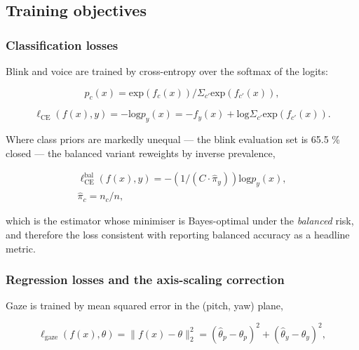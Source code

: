 \FloatBarrier

\subsection{Training objectives}

\subsubsection{Classification losses}

Blink and voice are trained by cross-entropy over the softmax of the logits:

\begin{equation}
\label{eq:87}
p_c(x) = \mathrm{exp}( f_c(x) ) / \Sigma _{c'} \mathrm{exp}( f_{c'}(x) ),
\end{equation}

\begin{equation}
\label{eq:88}
\ell _{\mathrm{CE}}( f(x), y ) = - \mathrm{log} p_y(x) = - f_y(x) + \mathrm{log} \Sigma _{c'} \mathrm{exp}( f_{c'}(x) ).
\end{equation}

Where class priors are markedly unequal --- the blink evaluation set is 65.5 \% closed --- the balanced variant reweights by inverse prevalence,

\begin{equation}
\label{eq:89}
\begin{aligned}
\ell _{\mathrm{CE}}^{\mathrm{bal}}( f(x), y ) = - ( 1 / ( C \cdot \hat{\pi }_y ) ) \mathrm{log} p_y(x), \\
\hat{\pi }_c = n_c / n ,
\end{aligned}
\end{equation}

which is the estimator whose minimiser is Bayes-optimal under the \emph{balanced} risk, and therefore the loss consistent with reporting balanced accuracy as a headline metric.

\subsubsection{Regression losses and the axis-scaling correction}

Gaze is trained by mean squared error in the (pitch, yaw) plane,

\begin{equation}
\label{eq:90}
\ell _{\mathrm{gaze}}( f(x), \theta ) = \| f(x) - \theta \|_{2}^{2} = ( \hat{\theta }_p - \theta _p )^{2} + ( \hat{\theta }_y - \theta _y )^{2} ,
\end{equation}


